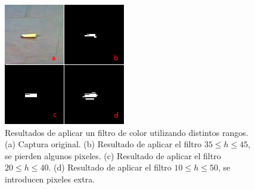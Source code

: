 \begin{figure}[tpb]
\begin{center}
  \includegraphics[scale=0.8]{figuras/hue.png}
\end{center}
  \caption{\small Resultados de aplicar un filtro de color utilizando distintos rangos. (a) Captura original. (b) Resultado de aplicar el filtro $35\le h \le45$, se pierden algunos pixeles. (c) Resultado de aplicar el filtro $20\le h \le40$. (d) Resultado de aplicar el filtro $10 \le h \le 50$, se introducen pixeles extra.} 
  \label{fig:hue_range}
\end{figure}

